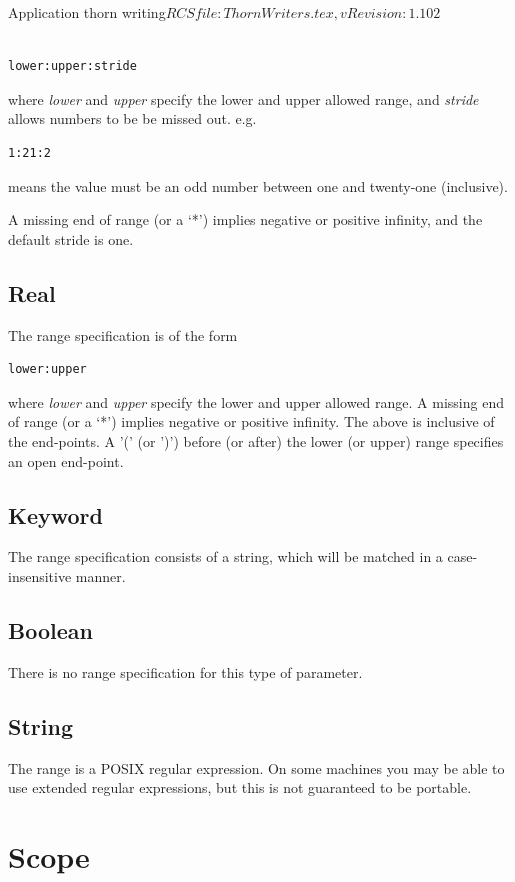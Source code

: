 \begin{cactuspart}{2}{Application thorn writing}{$RCSfile: ThornWriters.tex,v $}{$Revision: 1.102 $}
\begin{verbatim}

lower:upper:stride

\end{verbatim}

where {\em lower} and {\em upper} specify the lower and upper allowed
range, and {\em stride} allows numbers to be be missed out.  e.g.
\begin{verbatim}
1:21:2
\end{verbatim}
means the value must be an odd number between one and twenty-one
(inclusive).

A missing end of range (or a `*') implies negative or positive
infinity, and the default stride is one.

\subsection{Real}

The range specification is of the form
\begin{verbatim}
lower:upper
\end{verbatim}
where {\em lower} and {\em upper} specify the lower and upper allowed
range.  A missing end of range (or a `*') implies negative or positive
infinity.  The above is inclusive of the end-points.  A '(' (or ')')
before (or after) the lower (or upper) range specifies an open end-point.

\subsection{Keyword}

The range specification consists of a string, which will be matched in
a case-insensitive manner.

\subsection{Boolean}

There is no range specification for this type of parameter.

\subsection{String}

The range is a POSIX regular expression.  On some machines you may be
able to use extended regular expressions, but this is not guaranteed
to be portable.

\section{Scope}


\end{cactuspart}
